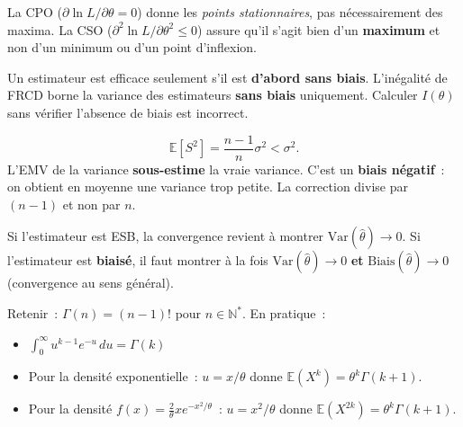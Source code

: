 \documentclass[11pt,a4paper]{article}
\newcommand{\E}{\mathbb{E}}
\newcommand{\Var}{\mathrm{Var}}
\newcommand{\biais}[1]{\mathrm{Biais}(#1)}
\begin{document}
\begin{alertbox}
La CPO ($\partial\ln L/\partial\theta=0$) donne les \textit{points stationnaires}, pas n\'ecessairement des maxima. La CSO ($\partial^2\ln L/\partial\theta^2\leq 0$) assure qu'il s'agit bien d'un \textbf{maximum} et non d'un minimum ou d'un point d'inflexion.
\end{alertbox}

\begin{alertbox}
Un estimateur est efficace seulement s'il est \textbf{d'abord sans biais}. L'in\'egalit\'e de FRCD borne la variance des estimateurs \textbf{sans biais} uniquement. Calculer $I(\theta)$ sans v\'erifier l'absence de biais est incorrect.
\end{alertbox}

\begin{alertbox}
$$\E[S^2] = \frac{n-1}{n}\sigma^2 < \sigma^2.$$
L'EMV de la variance \textbf{sous-estime} la vraie variance. C'est un \textbf{biais n\'egatif}~: on obtient en moyenne une variance trop petite. La correction divise par $(n-1)$ et non par $n$.
\end{alertbox}

\begin{alertbox}
Si l'estimateur est ESB, la convergence revient \`a montrer $\Var(\hat\theta)\to 0$. Si l'estimateur est \textbf{biais\'e}, il faut montrer \`a la fois $\Var(\hat\theta)\to 0$ \textbf{et} $\biais{\hat\theta}\to 0$ (convergence au sens g\'en\'eral).
\end{alertbox}

\begin{alertbox}
Retenir~: $\Gamma(n)=(n-1)!$ pour $n\in\mathbb{N}^*$. En pratique~:
\begin{itemize}
  \item $\int_0^\infty u^{k-1}e^{-u}\,du = \Gamma(k)$
  \item Pour la densit\'e exponentielle~: $u=x/\theta$ donne $\E(X^k)=\theta^k\Gamma(k+1)$.
  \item Pour la densit\'e $f(x)=\frac{2}{\theta}xe^{-x^2/\theta}$~: $u=x^2/\theta$ donne $\E(X^{2k})=\theta^k\Gamma(k+1)$.
\end{itemize}
\end{alertbox}

\newpage
\end{document}
